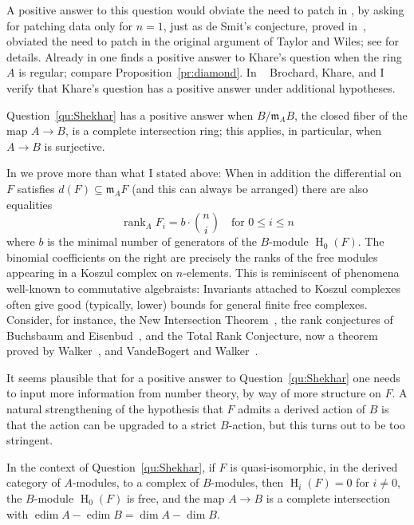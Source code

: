 \documentclass[twoside,leqno]{article}
\newcommand{\edim}{\operatorname{edim}}
\newcommand{\fm}{{\mathfrak m}}
\newcommand{\hh}{\operatorname{H}}
\newcommand{\rank}{\operatorname{rank}}
\begin{document}
A positive answer to this question would obviate the need to patch in \cite{Calegari/Geraghty:2018}, by asking for patching data only for $n=1$,  just as de Smit's conjecture, proved in~\cite{Brochard:2017}, obviated the need to patch in the original argument of Taylor and Wiles; see \cite[Section~5]{Brochard/Iyengar/Khare:2025} for details.  Already in \cite{Calegari/Geraghty:2018} one finds a positive answer to Khare's question when the ring $A$ is regular; compare Proposition~\ref{pr:diamond}.  In ~\cite{Brochard/Iyengar/Khare:2025} Brochard, Khare, and I verify that Khare's question has a positive answer under additional hypotheses.

\begin{theorem}
\label{th:khare}
Question~\ref{qu:Shekhar} has a positive answer when  $B/\fm_AB$, the closed fiber of the map $A\to B$, is a complete intersection ring; this applies, in particular, when $A\to B$ is surjective.
\end{theorem}

In \cite[Theorem~6.1]{Brochard/Iyengar/Khare:2025} we prove more than what I stated above: When in addition the differential on $F$ satisfies $d(F)\subseteq \fm_AF$ (and this can always be arranged) there are also equalities
\[
\rank_AF_i =b\cdot \binom ni \quad\text{for $0\le i\le n$}
\]
where $b$ is the minimal number of generators of the $B$-module $\hh_0(F)$. The binomial coefficients on the right are precisely the ranks of the free modules appearing in a Koszul complex on $n$-elements. This is reminiscent of phenomena  well-known to commutative algebraists: Invariants attached to Koszul complexes often give good (typically, lower) bounds for general finite free complexes. Consider, for instance, the New Intersection Theorem~\cite{Roberts:1991}, the rank conjectures of Buchsbaum and Eisenbud~\cite{Buchsbaum/Eisenbud:1977}, and the Total Rank Conjecture, now a theorem proved by Walker~\cite{Walker:2017}, and VandeBogert and Walker~\cite{VandeBogert/Walker:2025}.
 
 It seems plausible that for a positive answer to Question~\ref{qu:Shekhar} one needs to input more information from number theory, by way of more structure on $F$. A natural strengthening of the hypothesis that $F$ admits a derived action of $B$ is that the action can be upgraded to a strict $B$-action, but this turns out to be too stringent. 

 \begin{theorem}
     \label{th:rigid-action}
     In the context of Question~\ref{qu:Shekhar}, if $F$ is quasi-isomorphic, in the derived category of $A$-modules,  to a complex of $B$-modules, then $\hh_i(F)=0$ for $i\ne 0$, the $B$-module $\hh_0(F)$ is free, and the map $A\to B$ is a  complete intersection with $\edim A-\edim B=\dim A - \dim B$.
 \end{theorem}
\end{document}
